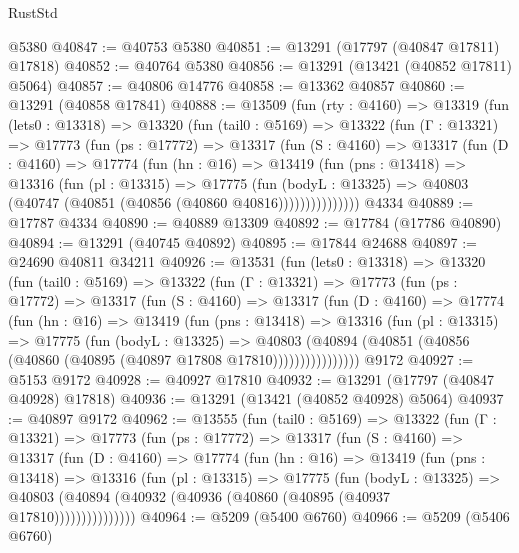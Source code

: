 \begin{lexlean}{RustStd}
\begin{coremodule}
    @5380
@40847 := @40753 @5380
@40851 := @13291 (@17797 (@40847 @17811) @17818)
@40852 := @40764 @5380
@40856 := @13291 (@13421 (@40852 @17811) @5064)
@40857 := @40806 @14776
@40858 := @13362 @40857
@40860 := @13291 (@40858 @17841)
@40888 := @13509
    (fun (rty : @4160) =>
    @13319
      (fun (lets0 : @13318) =>
      @13320
        (fun (tail0 : @5169) =>
        @13322
          (fun (Γ : @13321) =>
          @17773
            (fun (ps : @17772) =>
            @13317
              (fun (S : @4160) =>
              @13317
                (fun (D : @4160) =>
                @17774
                  (fun (hn : @16) =>
                  @13419
                    (fun (pns : @13418) =>
                    @13316
                      (fun (pl : @13315) =>
                      @17775
                        (fun (bodyL : @13325) =>
                        @40803 (@40747 (@40851 (@40856 (@40860 @40816)))))))))))))))
    @4334
@40889 := @17787 @4334
@40890 := @40889 @13309
@40892 := @17784 (@17786 @40890)
@40894 := @13291 (@40745 @40892)
@40895 := @17844 @24688
@40897 := @24690 @40811 @34211
@40926 := @13531
    (fun (lets0 : @13318) =>
    @13320
      (fun (tail0 : @5169) =>
      @13322
        (fun (Γ : @13321) =>
        @17773
          (fun (ps : @17772) =>
          @13317
            (fun (S : @4160) =>
            @13317
              (fun (D : @4160) =>
              @17774
                (fun (hn : @16) =>
                @13419
                  (fun (pns : @13418) =>
                  @13316
                    (fun (pl : @13315) =>
                    @17775
                      (fun (bodyL : @13325) =>
                      @40803
                        (@40894
                          (@40851 (@40856 (@40860 (@40895 (@40897 @17808 @17810))))))))))))))))
    @9172
@40927 := @5153 @9172
@40928 := @40927 @17810
@40932 := @13291 (@17797 (@40847 @40928) @17818)
@40936 := @13291 (@13421 (@40852 @40928) @5064)
@40937 := @40897 @9172
@40962 := @13555
    (fun (tail0 : @5169) =>
    @13322
      (fun (Γ : @13321) =>
      @17773
        (fun (ps : @17772) =>
        @13317
          (fun (S : @4160) =>
          @13317
            (fun (D : @4160) =>
            @17774
              (fun (hn : @16) =>
              @13419
                (fun (pns : @13418) =>
                @13316
                  (fun (pl : @13315) =>
                  @17775
                    (fun (bodyL : @13325) =>
                    @40803 (@40894 (@40932 (@40936 (@40860 (@40895 (@40937 @17810)))))))))))))))
@40964 := @5209 (@5400 @6760)
@40966 := @5209 (@5406 @6760)

\end{coremodule}
\end{lexlean}
